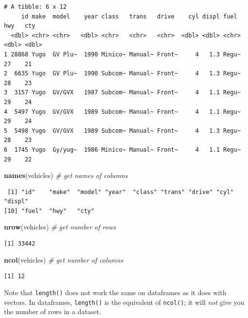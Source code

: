 \documentclass[
]{book}
\newenvironment{Shaded}{\begin{snugshade}}{\end{snugshade}}
\newcommand{\CommentTok}[1]{\textcolor[rgb]{0.56,0.35,0.01}{\textit{#1}}}
\newcommand{\KeywordTok}[1]{\textcolor[rgb]{0.13,0.29,0.53}{\textbf{#1}}}
\newcommand{\NormalTok}[1]{#1}
\begin{document}
\begin{verbatim}
# A tibble: 6 x 12
     id make  model    year class   trans   drive    cyl displ fuel    hwy   cty
  <dbl> <chr> <chr>   <dbl> <chr>   <chr>   <chr>  <dbl> <dbl> <chr> <dbl> <dbl>
1 28868 Yugo  GV Plu~  1990 Minico~ Manual~ Front~     4   1.3 Regu~    27    21
2  6635 Yugo  GV Plu~  1990 Subcom~ Manual~ Front~     4   1.3 Regu~    28    23
3  3157 Yugo  GV/GVX   1987 Subcom~ Manual~ Front~     4   1.1 Regu~    29    24
4  5497 Yugo  GV/GVX   1989 Subcom~ Manual~ Front~     4   1.1 Regu~    29    24
5  5498 Yugo  GV/GVX   1989 Subcom~ Manual~ Front~     4   1.3 Regu~    28    23
6  1745 Yugo  Gy/yug~  1986 Minico~ Manual~ Front~     4   1.1 Regu~    29    22
\end{verbatim}

\begin{Shaded}
\begin{Highlighting}[]
\KeywordTok{names}\NormalTok{(vehicles) }\CommentTok{# get names of columns}
\end{Highlighting}
\end{Shaded}

\begin{verbatim}
 [1] "id"    "make"  "model" "year"  "class" "trans" "drive" "cyl"   "displ"
[10] "fuel"  "hwy"   "cty"  
\end{verbatim}

\begin{Shaded}
\begin{Highlighting}[]
\KeywordTok{nrow}\NormalTok{(vehicles) }\CommentTok{# get number of rows}
\end{Highlighting}
\end{Shaded}

\begin{verbatim}
[1] 33442
\end{verbatim}

\begin{Shaded}
\begin{Highlighting}[]
\KeywordTok{ncol}\NormalTok{(vehicles) }\CommentTok{# get number of columns}
\end{Highlighting}
\end{Shaded}

\begin{verbatim}
[1] 12
\end{verbatim}

Note that \texttt{length()} does not work the same on dataframes as it does with vectors. In dataframes, \texttt{length()} is the equivalent of \texttt{ncol()}; it will \emph{not} give you the number of rows in a dataset.
\end{document}
